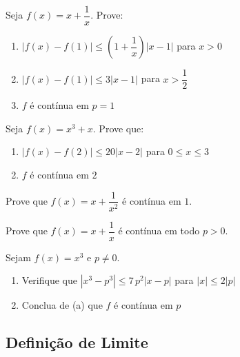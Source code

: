 \begin{exercicio}[23]
Seja $f(x) = x + \dfrac{1}{x}$. Prove:
\begin{enumerate}[label=\alph*)]
    \item $|f(x) - f(1)| \le \left(1 + \dfrac{1}{x}\right)|x - 1|$ para $x > 0$
    \item $|f(x) - f(1)| \le 3|x - 1|$ para $x > \dfrac{1}{2}$
    \item $f$ é contínua em $p = 1$
\end{enumerate}
\end{exercicio}

\begin{exercicio}[24]
Seja $f(x) = x^3 + x$. Prove que:
\begin{enumerate}[label=\alph*)]
    \item $|f(x) - f(2)| \le 20|x - 2|$ para $0 \le x \le 3$
    \item $f$ é contínua em $2$
\end{enumerate}
\end{exercicio}

\begin{exercicio}[25]
Prove que $f(x) = x + \dfrac{1}{x^2}$ é contínua em $1$.
\end{exercicio}

\begin{exercicio}[26]
Prove que $f(x) = x + \dfrac{1}{x}$ é contínua em todo $p > 0$.
\end{exercicio}

\begin{exercicio}[27]
Sejam $f(x) = x^3$ e $p \neq 0$.
\begin{enumerate}[label=\alph*)]
    \item Verifique que $|x^3 - p^3| \le 7\,p^2|x - p|$ para $|x| \le 2|p|$
    \item Conclua de (a) que $f$ é contínua em $p$
\end{enumerate}
\end{exercicio}

\clearpage

\subsection{Definição de Limite}

